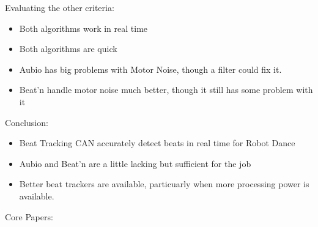 \documentclass{beamer}
\begin{document}
	\begin{frame}
		Evaluating the other criteria:
		\begin{itemize}
			\item Both algorithms work in real time
			\item Both algorithms are quick
			\item Aubio has big problems with Motor Noise, though a filter could fix it.
			\item Beat'n handle motor noise much better, though it still has some problem with it
		\end{itemize}
	\end{frame}
	\begin{frame}
		Conclusion:
		\begin{itemize}
			\item Beat Tracking CAN accurately detect beats in real time for Robot Dance
			\item Aubio and Beat'n are a little lacking but sufficient for the job
			\item Better beat trackers are available, particuarly when more processing power is available.
		\end{itemize}
	\end{frame}
	\begin{frame}
		Core Papers:
		
	\end{frame}
	
\end{document}
